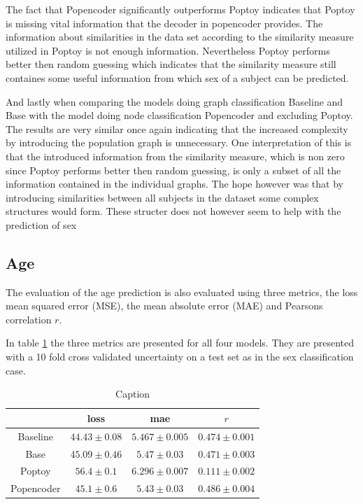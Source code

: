 The fact that Popencoder significantly outperforms Poptoy indicates that Poptoy is missing vital information that the decoder in popencoder provides. The information about similarities in the data set according to the similarity measure utilized in Poptoy is not enough information. Nevertheless Poptoy performs better then random guessing which indicates that the similarity measure still containes some useful information from which sex 
of a subject can be predicted. 

And lastly when comparing the models doing graph classification Baseline and Base with the model doing node classification Popencoder and excluding Poptoy. The results are very similar once again indicating that the increased complexity by introducing the population graph is unnecessary. One interpretation of this is that the introduced information from the similarity measure, which is non zero since Poptoy performs better then random guessing, is only a subset of all the information contained in the individual graphs. The hope however was that by introducing  similarities between all subjects in the dataset some complex structures would form. These structer does not however seem to help with the prediction of sex


\subsection{Age}
The evaluation of the age prediction is also evaluated using three metrics, the loss mean squared error (MSE), the mean absolute error (MAE) and Pearsons correlation $r$. 

In table \ref{tab:age_model_results} the three metrics are presented for all four models. They are presented with a 10 fold cross validated uncertainty on a test set as in the sex classification case. 
\begin{table}[H]
    \centering
    \begin{tabular}{c|c|c|c}
         &  loss & mae & $r$ \\ \hline 
        Baseline &$44.43\pm0.08$& $5.467\pm0.005$&$0.474\pm0.001$\\
        Base & $45.09\pm0.46$& $5.47\pm 0.03 $& $0.471\pm0.003$\\
        Poptoy &$56.4\pm 0.1$ & $6.296\pm0.007$ &$ 0.111\pm 0.002$\\
        Popencoder &$45.1\pm0.6$& $5.43\pm 0.03$ & $0.486\pm0.004$\\
    \end{tabular}
    \caption{Caption}
    \label{tab:age_model_results}
\end{table}

